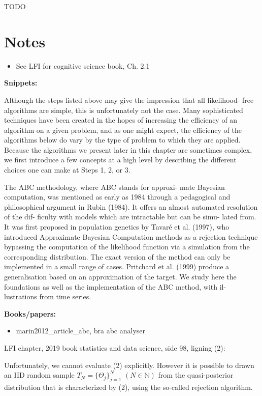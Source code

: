 TODO

\section{Notes}

\begin{itemize}
    \item See LFI for cognitive science book, Ch. 2.1
\end{itemize}

\textbf{Snippets:}

Although the steps listed above may give the impression that all likelihood- free algorithms are simple, this is unfortunately not the case. Many sophisticated techniques have been created in the hopes of increasing the efficiency of an algorithm on a given problem, and as one might expect, the efficiency of the algorithms below do vary by the type of problem to which they are applied. Because the algorithms we present later in this chapter are sometimes complex, we first introduce a few concepts at a high level by describing the different choices one can make at Steps 1, 2, or 3. 

The ABC methodology, where ABC stands for approxi- mate Bayesian computation, was mentioned as early as 1984 through a pedagogical and philosophical argument in Rubin (1984). It offers an almost automated resolution of the dif- ficulty with models which are intractable but can be simu- lated from. It was first proposed in population genetics by Tavaré et al. (1997), who introduced Approximate Bayesian Computation methods as a rejection technique bypassing the computation of the likelihood function via a simulation from the corresponding distribution. The exact version of the method can only be implemented in a small range of cases. Pritchard et al. (1999) produce a generalisation based on an approximation of the target. We study here the foundations as well as the implementation of the ABC method, with il- lustrations from time series. 

\textbf{Books/papers:} 

\begin{itemize}
    \item marin2012\_article\_abc, bra abc analyser 
\end{itemize}

LFI chapter, 2019 book statistics and data science, side 98, ligning (2): 

Unfortunately, we cannot evaluate (2) explicitly. However it is possible to drawn an IID random sample $T_N = \{ \Theta_j \}_{j=1}^N$ $(N \in \mathbb{N})$ from the quasi-posterior distribution that is characterized by (2), using the so-called rejection algorithm. 

